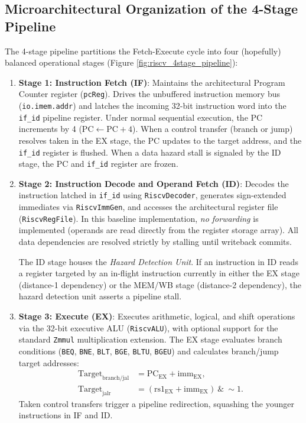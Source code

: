 \subsection{Microarchitectural Organization of the 4-Stage Pipeline}

The 4-stage pipeline partitions the Fetch-Execute cycle into four (hopefully) balanced operational stages (Figure \ref{fig:riscv_4stage_pipeline}):
\begin{enumerate}
    \item \textbf{Stage 1: Instruction Fetch (IF)}:
    Maintains the architectural Program Counter register (\texttt{pcReg}). Drives the unbuffered instruction memory bus (\texttt{io.imem.addr}) and latches the incoming 32-bit instruction word into the \texttt{if\_id} pipeline register. Under normal sequential execution, the PC increments by 4 ($\text{PC} \leftarrow \text{PC} + 4$). When a control transfer (branch or jump) resolves taken in the EX stage, the PC updates to the target address, and the \texttt{if\_id} register is flushed. When a data hazard stall is signaled by the ID stage, the PC and \texttt{if\_id} register are frozen.
    
    \item \textbf{Stage 2: Instruction Decode and Operand Fetch (ID)}:
    Decodes the instruction latched in \texttt{if\_id} using \texttt{RiscvDecoder}, generates sign-extended immediates via \texttt{RiscvImmGen}, and accesses the architectural register file (\texttt{RiscvRegFile}). In this baseline implementation, \textit{no forwarding} is implemented (operands are read directly from the register storage array). All data dependencies are resolved strictly by stalling until writeback commits.
    
    The ID stage houses the \textit{Hazard Detection Unit}. If an instruction in ID reads a register targeted by an in-flight instruction currently in either the EX stage (distance-1 dependency) or the MEM/WB stage (distance-2 dependency), the hazard detection unit asserts a pipeline stall.
    
    \item \textbf{Stage 3: Execute (EX)}:
    Executes arithmetic, logical, and shift operations via the 32-bit executive ALU (\texttt{RiscvALU}), with optional support for the standard \texttt{Zmmul} multiplication extension. The EX stage evaluates branch conditions (\texttt{BEQ}, \texttt{BNE}, \texttt{BLT}, \texttt{BGE}, \texttt{BLTU}, \texttt{BGEU}) and calculates branch/jump target addresses:
    \begin{align}
    \text{Target}_{\text{branch/jal}} &= \text{PC}_{\text{EX}} + \text{imm}_{\text{EX}}, \\
    \text{Target}_{\text{jalr}} &= (\text{rs1}_{\text{EX}} + \text{imm}_{\text{EX}}) \ \& \ \sim 1.
    \end{align}
    Taken control transfers trigger a pipeline redirection, squashing the younger instructions in IF and ID.
    

\end{enumerate}

